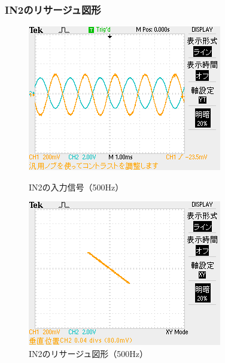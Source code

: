 \documentclass{jlreq}
\numberwithin{equation}{section}
\begin{document}
\subsubsection{IN2のリサージュ図形}
\begin{figure}[H]
  \centering
  \begin{minipage}{0.45\textwidth}
    \centering
    \includegraphics[width=\textwidth, keepaspectratio]{IN2_500Hz_YT.png}
    \caption{IN2の入力信号（500Hz）}
  \end{minipage}
  \hfill
  \begin{minipage}{0.45\textwidth}
    \centering
    \includegraphics[width=\textwidth, keepaspectratio]{IN2_500Hz_XY.png}
    \caption{IN2のリサージュ図形（500Hz）}
  \end{minipage}
\end{figure}
\end{document}
